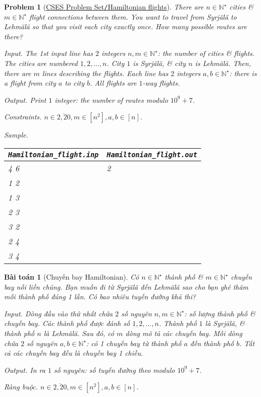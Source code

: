 \documentclass{article}
\newtheorem{baitoan}{Bài toán}
\newtheorem{problem}{Problem}
\begin{document}
\begin{problem}[\href{https://cses.fi/problemset/task/1690}{CSES Problem Set{\tt/}Hamiltonian flights}]
    There are $n\in\mathbb{N}^\star$ cities \& $m\in\mathbb{N}^\star$ flight connections between them. You want to travel from Syrjälä to Lehmälä so that you visit each city exactly once. How many possible routes are there?
    \item {\sf Input.} The 1st input line has $2$ integers $n,m\in\mathbb{N}^\star$: the number of cities \& flights. The cities are numbered $1,2,\ldots,n$. City $1$ is Syrjälä, \& city $n$ is Lehmälä. Then, there are $m$ lines describing the flights. Each line has $2$ integers $a,b\in\mathbb{N}^\star$: there is a flight from city $a$ to city $b$. All flights are $1$-way flights.
    \item {\sf Output.} Print $1$ integer: the number of routes modulo $10^9 + 7$.
    \item {\sf Constraints.} $n\in\overline{2,20},m\in[n^2],a,b\in[n]$.
    \item {\sf Sample.}
    \begin{table}[H]
        \centering
        \begin{tabular}{|l|l|}
            \hline
            \verb|Hamiltonian_flight.inp| & \verb|Hamiltonian_flight.out| \\
            \hline
            4 6 & 2\\
            1 2 & \\
            1 3 & \\
            2 3 & \\
            3 2 & \\
            2 4 & \\
            3 4 & \\
            \hline
        \end{tabular}
    \end{table}
\end{problem}

\begin{baitoan}[Chuyến bay Hamiltonian]
    Có $n\in\mathbb{N}^\star$ thành phố \& $m\in\mathbb{N}^\star$ chuyến bay nối liền chúng. Bạn muốn đi từ Syrjälä đến Lehmälä sao cho bạn ghé thăm mỗi thành phố đúng 1 lần. Có bao nhiêu tuyến đường khả thi?
    \item {\sf Input.} Dòng đầu vào thứ nhất chứa $2$ số nguyên $n,m\in\mathbb{N}^\star$: số lượng thành phố \& chuyến bay. Các thành phố được đánh số $1,2,\ldots,n$. Thành phố $1$ là Syrjälä, \& thành phố $n$ là Lehmälä. Sau đó, có $m$ dòng mô tả các chuyến bay. Mỗi dòng chứa $2$ số nguyên $a,b\in\mathbb{N}^\star$: có 1 chuyến bay từ thành phố $a$ đến thành phố $b$. Tất cả các chuyến bay đều là chuyến bay 1 chiều.
    \item {\sf Output.} In ra $1$ số nguyên: số tuyến đường theo modulo $10^9 + 7$.
    \item {\sf Ràng buộc.} $n\in\overline{2,20},m\in[n^2],a,b\in[n]$.
\end{baitoan}
\end{document}
